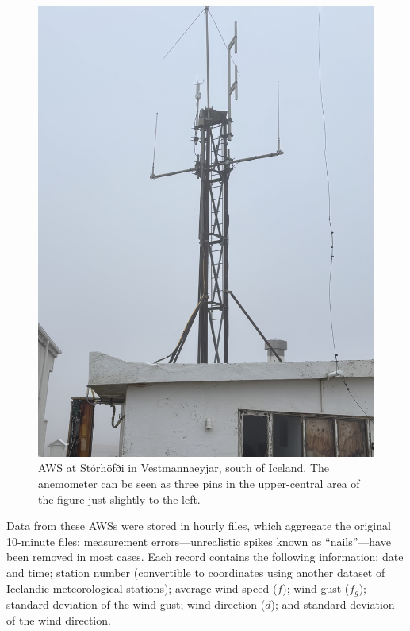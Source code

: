 \begin{figure}
  \centering
  \includegraphics[scale=0.3]{Figures/storhofdi.jpeg}
  \caption[AWS at Stórhöfði in Vestmannaeyjar, south of Iceland.]{AWS at Stórhöfði in Vestmannaeyjar, south of Iceland. The anemometer can be seen as three pins in the upper-central area of the figure just slightly to the left.}
  \label{fig:storhofdi}
\end{figure}

Data from these AWSs were stored in hourly files, which aggregate the original 10-minute files; measurement errors—unrealistic spikes known as “nails”—have been removed in most cases. Each record contains the following information: date and time; station number (convertible to coordinates using another dataset of Icelandic meteorological stations); average wind speed ($f$); wind gust ($f_g$); standard deviation of the wind gust; wind direction ($d$); and standard deviation of the wind direction.

